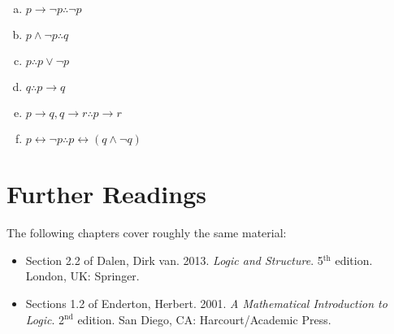 \begin{enumerate}[\thesection.1]
\begin{enumerate}[(a)]
					\item $p\to \neg p\therefore \neg p$
					
					\item $p\land \neg p\therefore q$
					
					\item $p\therefore p\lor \neg p$
					
					\item $q\therefore p\to q$
					
					\item $p\to q, q\to r\therefore p\to r$
					
					\item $p\leftrightarrow \neg p\therefore p\leftrightarrow (q\land \neg q)$ 
									
				\end{enumerate}
			
	\end{enumerate}

\section{Further Readings}

The following chapters cover roughly the same material:

\begin{itemize}
	
		\item Section 2.2 of Dalen, Dirk van. 2013. \emph{Logic and Structure}. 5$^\text{th}$ edition. London, UK: Springer.
		
		\item Sections 1.2 of Enderton, Herbert. 2001. \emph{A Mathematical Introduction to Logic}. 2$^\text{nd}$ edition. San Diego, CA: Harcourt/Academic Press.
			
	\end{itemize}

\vfill

\hfill {}


